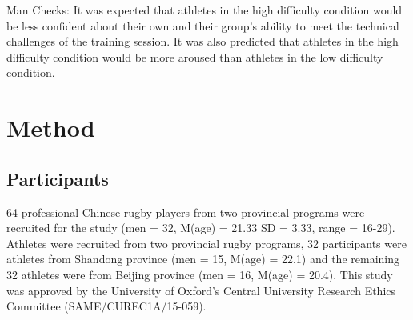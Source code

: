 





Man Checks:
It was expected that athletes in the high difficulty condition would be less confident about their own and their group's ability to meet the technical challenges of the training session.  It was also predicted that athletes in the high difficulty condition would be more aroused than athletes in the low difficulty condition.
















\clearpage
\section{Method}

\subsection{Participants}
64 professional Chinese rugby players from two provincial programs were recruited for the study (men = 32, M(age) = 21.33 SD = 3.33, range = 16-29).  Athletes were recruited from two provincial rugby programs, 32
participants were athletes from Shandong province (men = 15, M(age) = 22.1) and the remaining 32 athletes were from Beijing province (men = 16, M(age) = 20.4).  This study was approved by the University of Oxford’s Central University Research Ethics Committee (SAME/CUREC1A/15-059).


